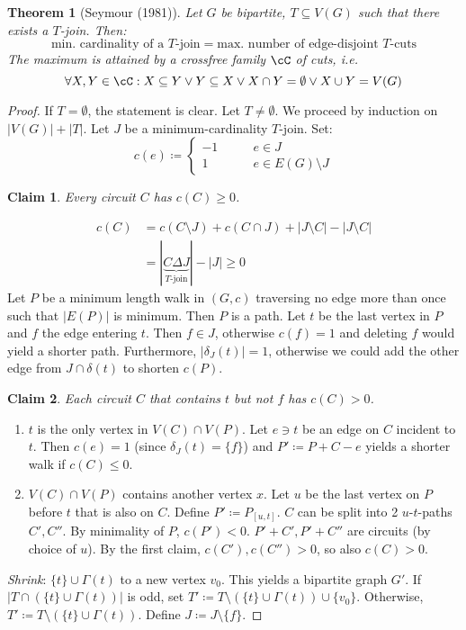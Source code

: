 \documentclass[11pt, a4paper]{article}
\newcommand{\abs}[1]{\left\lvert#1\right\rvert}
\newcommand{\set}[1]{\{#1\}}
\newtheorem{theorem}{Theorem}[section]
\newtheorem*{claim}{Claim}
\theoremstyle{remark}
\theoremstyle{definition}
\begin{document}
\begin{theorem}[Seymour (1981)]\label{thm:seymour-join-cut}
	Let $G$ be bipartite, $T\subseteq V(G)$ such that there exists a
	$T$-join. Then:
	\[\text{min. cardinality of a $T$-join}=\text{max. number of
			edge-disjoint $T$-cuts}\]
	The maximum is attained by a crossfree family $\cC$ of cuts, i.e.
	\[\forall X,Y\in\cC: X\subseteq Y\lor Y\subseteq X \lor X\cap Y=\emptyset
		\lor X\cup Y=V(G)\]
\end{theorem}
\begin{proof}
	If $T=\emptyset$, the statement is clear.
	Let $T\neq\emptyset$. We proceed by induction on $\abs{V(G)}+\abs{T}$.
	Let $J$ be a minimum-cardinality $T$-join. Set:
	\[c(e)\coloneqq \begin{cases}
			-1 \qquad & e\in J               \\
			1 \qquad  & e\in E(G)\setminus J
		\end{cases}\]
	\begin{claim}
		Every circuit $C$ has $c(C)\geq0$.
	\end{claim}
	\begin{align*}
		c(C) & =c(C\setminus J)+c(C\cap J)+\abs{J\setminus C}-\abs{J\setminus C} \\
		     & =\abs{\underbrace{C\Delta J}_{T\text{-join}}}-\abs{J}\geq0
	\end{align*}
	Let $P$ be a minimum length walk in $(G,c)$ traversing no edge more than
	once such that $\abs{E(P)}$ is minimum. Then $P$ is a path. Let $t$ be
	the last vertex in $P$ and $f$ the edge entering $t$. Then $f\in J$,
	otherwise $c(f)=1$ and deleting $f$ would yield a shorter path.
	Furthermore, $\abs{\delta_J(t)}=1$, otherwise we could add the other edge
	from $J\cap\delta(t)$ to shorten $c(P)$.

	\begin{claim}
		Each circuit $C$ that contains $t$ but not $f$ has $c(C)>0$.
	\end{claim}
	\begin{enumerate}
		\item[Case 1:] $t$ is the only vertex in $V(C)\cap V(P)$. Let $e\ni t$ be
		an edge on $C$ incident to $t$. Then $c(e)=1$ (since
		$\delta_J(t)=\set{f}$) and $P'\coloneqq P+C-e$ yields a shorter walk
		if $c(C)\leq0$.

		\item[Case 2:] $V(C)\cap V(P)$ contains another vertex $x$. Let $u$ be the
		last vertex on $P$ before $t$ that is also on $C$. Define
		$P'\coloneqq P_{[u,t]}$. $C$ can be split into 2 $u$-$t$-paths
		$C',C''$. By minimality of $P$, $c(P')<0$. $P'+C',P'+C''$ are
		circuits (by choice of $u$). By the first claim, $c(C'),c(C'')>0$, so
		also $c(C)>0$.
	\end{enumerate}
	\emph{Shrink}: $\set{t}\cup\Gamma(t)$ to a new vertex $v_0$. This yields
	a bipartite graph $G'$. If $\abs{T\cap (\set{t}\cup \Gamma(t))}$ is odd,
	set $T'\coloneqq T\setminus(\set{t}\cup\Gamma(t))\cup\set{v_0}$. Otherwise,
	$T'\coloneqq T\setminus(\set{t}\cup\Gamma(t))$. Define $J\coloneqq J\setminus
		\set{f}$.


\end{proof}
\end{document}
